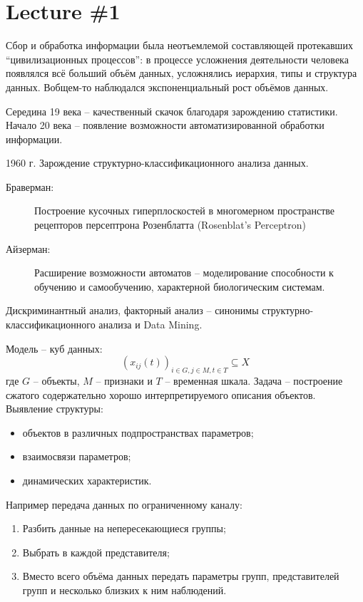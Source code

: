 \documentclass[a4paper]{article}
\title{\rus{Структурно-классификационные методы интеллектуального анализа}}
\author{Nazarov Ivan, \rus{101мНОД(ИССА)}\\the DataScience Collective}
\newcommand{\brac}[1]{{\left ( #1 \right )}}
\newcommand{\eng}[1]{\foreignlanguage{english}{#1}}
\begin{document}
\maketitle

\section{Lecture \#1} %
\label{sec:lecture_1}
Сбор и обработка информации была неотъемлемой составляющей протекавших ``цивилизационных процессов'':
в процессе усложнения деятельности человека появлялся всё больший объём данных, усложнялись иерархия, типы и структура данных.
Вобщем-то наблюдался экспоненциальный рост объёмов данных.

Середина 19 века -- качественный скачок благодаря зарождению статистики.
Начало 20 века -- появление возможности автоматизированной обработки информации.

1960 г. Зарождение структурно-классификационного анализа данных.

\begin{description}
	\item[Браверман:] Построение кусочных гиперплоскостей в многомерном пространстве рецепторов персептрона Розенблатта (\eng{Rosenblat's Perceptron})
	\item[Айзерман:] Расширение возможности автоматов -- моделирование способности к обучению и самообучению, характерной биологическим системам.
\end{description}

Дискриминантный анализ, факторный анализ -- синонимы структурно-классификационного анализа и \eng{Data Mining}.

Модель -- куб данных: \[ \brac{ x_{ij}(t) }_{i\in G, j\in M, t\in T} \subseteq X\] где $G$ -- объекты, $M$ -- признаки и $T$ -- временная шкала.
Задача -- построение сжатого содержательно хорошо интерпретируемого описания объектов.
Выявление структуры: \begin{itemize}
	\item объектов в различных подпространствах параметров;
	\item взаимосвязи параметров;
	\item динамических характеристик.
\end{itemize}

Например передача данных по ограниченному каналу: \begin{enumerate}
	\item Разбить данные на непересекающиеся группы;
	\item Выбрать в каждой представителя;
	\item Вместо всего объёма данных передать параметры групп, представителей групп и несколько близких к ним наблюдений.
\end{enumerate}
\end{document}
